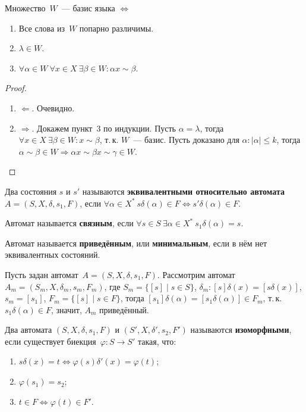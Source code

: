 \begin{theorem}
Множество~$W$~--- базис языка $\Leftrightarrow$
\begin{enumerate}
	\item Все слова из~$W$ попарно различимы.
	\item $\lambda \in W$.
	\item $\forall \alpha \in W \ \forall x \in X \ \exists \beta \in W \colon \alpha x \sim \beta$.
\end{enumerate}
\end{theorem}
\begin{proof}
\begin{enumerate}
	\item $\Leftarrow$. Очевидно.
	\item $\Rightarrow$. Докажем пункт~3 по индукции.
		\indbase Пусть $\alpha = \lambda$, тогда $\forall x \in X \ \exists \beta \in W \colon x \sim \beta$, т.\,к. $W$~--- базис.
		\indstep Пусть доказано для $\alpha \colon |\alpha| \leqslant k$, тогда $\alpha \sim \beta \in W \Rightarrow \alpha x \sim \beta x \sim \gamma \in W$.
		\indend
\end{enumerate}
\end{proof}

Два состояния $s$ и $s'$ называются \textbf{эквивалентными относительно автомата~$A = (S, X, \delta, s_1, F)$}, если $\forall \alpha \in X^* \ \allowbreak s \delta(\alpha) \in F \Leftrightarrow s' \delta(\alpha) \in F$.

 Автомат называется \textbf{связным}, если $\forall s \in S \ \exists \alpha \in X^* \ s_1 \delta(\alpha) = s$.

  Автомат называется \textbf{приведённым}, или \textbf{минимальным}, если в нём нет эквивалентных состояний.

Пусть задан автомат~$A = (S, X, \delta, s_1, F)$.
Рассмотрим автомат~$A_m = (S_m, X, \delta_m, s_m, F_m)$, где $S_m = \{ [s] \mid s \in S \}$, $\delta_m \colon [s] \delta(x) = [s \delta(x)]$, $s_m = [s_1]$, $F_m = \{ [s] \mid s \in F \}$, тогда $[s_1] \delta(\alpha) = [s_1 \delta(\alpha)] \in F_m$, т.\,к. $s_1 \delta(\alpha) \in F$, значит, $A_m$ приведённый.

Два автомата $(S, X, \delta, s_1, F)$ и $(S', X, \delta', s_2, F')$ называются \textbf{изоморфными}, если существует биекция~$\varphi \colon S \to S'$ такая, что:
\begin{enumerate}
	\item $s \delta(x) = t \Leftrightarrow \varphi(s) \delta'(x) = \varphi(t)$;
	\item $\varphi(s_1) = s_2$;
	\item $t \in F \Leftrightarrow \varphi(t) \in F'$.
\end{enumerate}

